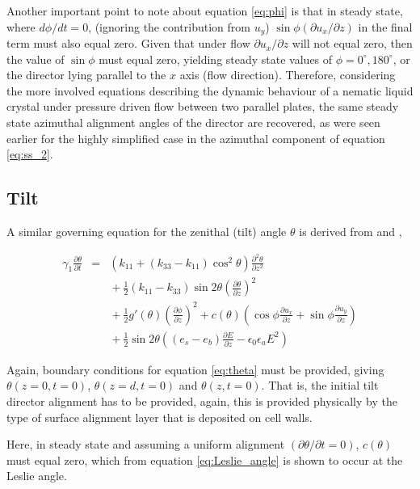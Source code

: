 Another important point to note about equation \ref{eq:phi} is that in steady state, where $d\phi/dt=0$, (ignoring the contribution from $u_y$) $\sin\phi\left(\partial u_x/\partial z\right)$ in the final term must also equal zero. Given that under flow $\partial u_x/\partial z$ will not equal zero, then the value of $\sin\phi$ must equal zero, yielding steady state values of $\phi=0^{\circ},180^{\circ}$, or the director lying parallel to the $x$ axis (flow direction). Therefore, considering the more involved equations describing the dynamic behaviour of a nematic liquid crystal under pressure driven flow between two parallel plates, the same steady state azimuthal alignment angles of the director are recovered, as were seen earlier for the highly simplified case in the azimuthal component of equation \ref{eq:ss_2}.

\subsection{Tilt}
A similar governing equation for the zenithal (tilt) angle $\theta$ is derived from \cite{Cornford2008} and \cite{Stewart2004},

\begin{eqnarray}
\nonumber \gamma_1\frac{\partial\theta}{\partial t} & = & \left(k_{11}+\left(k_{33}-k_{11}\right)\cos^2\theta\right)\frac{\partial^2\theta}{\partial z^2}\\
\nonumber	& & {} + \frac{1}{2}\left(k_{11}-k_{33}\right)\sin2\theta\left(\frac{\partial\theta}{\partial z}\right)^2\\
\nonumber	& & {} + \frac{1}{2}g'\left(\theta\right)\left(\frac{\partial\phi}{\partial z}\right)^2+c\left(\theta\right)\left(\cos\phi\frac{\partial 							u_x}{\partial z}+\sin\phi\frac{\partial u_y}{\partial z}\right)\\
	& & {} + \frac{1}{2}\sin2\theta\left(\left(e_s-e_b\right)\frac{\partial E}{\partial z}-\epsilon_0\epsilon_aE^2\right)
	\label{eq:theta}
\end{eqnarray}

Again, boundary conditions for equation \ref{eq:theta} must be provided, giving $\theta\left(z=0,t=0\right)$, $\theta\left(z=d,t=0\right)$ and $\theta\left(z,t=0\right)$. That is, the initial tilt director alignment has to be provided, again, this is provided physically by the type of surface alignment layer that is deposited on cell walls.

Here, in steady state and assuming a uniform alignment $\left(\partial\theta / \partial t=0\right)$, $c\left(\theta\right)$ must equal zero, which from equation \ref{eq:Leslie_angle} is shown to occur at the Leslie angle.

